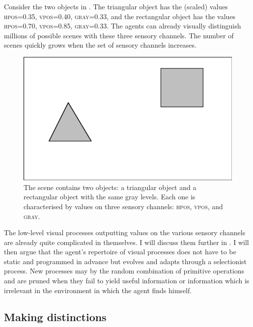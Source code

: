 Consider the two objects in . The triangular
object has the (scaled) values \textsc{hpos}=0.35, \textsc{vpos}=0.40, \textsc{gray}=0.33, and 
the rectangular object has the values \textsc{hpos}=0.70, \textsc{vpos}=0.85, 
\textsc{gray}=0.33. The agents can already visually distinguish
millions of possible scenes with these three sensory
channels. The number of scenes
quickly grows when the set of sensory channels increases. 

\begin{figure}[b]
  \centerline{\includegraphics[width=.50\textwidth]{chap2/figs/scene1-1.pdf}}
\caption{\label{scene1-1}The scene contains two 
objects: a triangular object and a rectangular object
with the same gray levels. 
Each one is characterised by values on three sensory 
channels: \textsc{hpos}, \textsc{vpos}, and \textsc{gray}.}
\end{figure}

The low-level visual processes outputting
values on the various sensory channels are already quite
complicated in themselves. I will discuss them further in 
. I will then argue that the 
agent's repertoire of visual processes does not have to be
static and programmed in advance but evolves and adapts
through a selectionist process. New processes may 
by the random combination of primitive operations and are
pruned when they fail to yield useful information or information 
which is irrelevant in the environment in which the agent 
finds himself. 

\subsection{Making distinctions}

